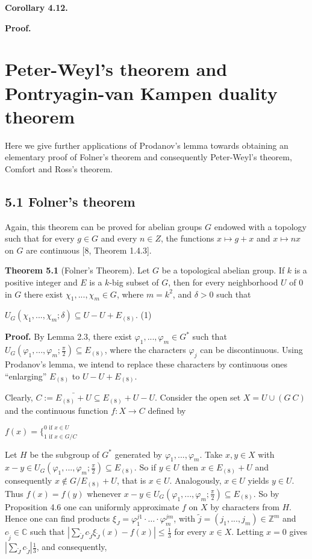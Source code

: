 \documentclass[12pt]{article}
\begin{document}
\textbf{Corollary 4.12.}


\textbf{Proof.}


\section{Peter-Weyl's theorem and Pontryagin-van Kampen duality theorem}


    Here we give further applications of Prodanov's lemma towards obtaining an elementary proof of Folner's theorem and
consequently Peter-Weyl's theorem, Comfort and Ross's theorem.


\subsection{5.1 Folner's theorem}


    Again, this theorem can be proved for abelian groups $G$ endowed with a topology such that for every $g \in G$ and every
$n \in Z$, the functions $x \mapsto g + x$ and $x \mapsto nx$ on $G$ are continuous [8, Theorem 1.4.3].


\textbf{Theorem 5.1} (Folner's Theorem). Let $G$ be a topological abelian group. If $k$ is a positive integer and $E$ is a $k$-big subset of $G$, then for
every neighborhood $U$ of 0 in $G$ there exist $\chi_1,...,\chi_m \in G$, where $m = k^2$, and $\delta > 0$ such that


    $U_G(\chi_1,...,\chi_m; \delta) \subseteq U - U + E_{(8)}$.  (1)


\textbf{Proof.} By Lemma 2.3, there exist $\varphi_1,...,\varphi_m \in G^*$ such that $U_G(\varphi_1,...,\varphi_m; \frac{\pi}{2} ) \subseteq E_{(8)}$, where the characters $\varphi_j$ can be
discontinuous. Using Prodanov's lemma, we intend to replace these characters by continuous ones “enlarging” $E_{(8)}$ to
$U - U + E_{(8)}$.


    Clearly, $C := \bar{E_{(8)} + U }\subseteq E_{(8)} + U - U$. Consider the open set $X = U \cup (G \ C)$ and the continuous function $f : X \to C$
defined by


    $f(x) = \{^{0 \text{ if } x \in U}_{1 \text{ if } x \in G / C} $


    Let $H$ be the subgroup of $G^*$ generated by $\varphi_1,...,\varphi_m$. Take $x, y \in X$ with $x - y \in U_G(\varphi_1,...,\varphi_m; \frac{\pi}{2} ) \subseteq E_{(8)}$. So if $y \in U$ then
$x \in E_{(8)} + U$ and consequently $x \notin G / E_{(8)} + U$, that is $x \in U$. Analogously, $x \in U$ yields $y \in U$. Thus $f(x) = f(y)$ whenever
$x - y \in U_G(\varphi_1,...,\varphi_m; \frac{\pi}{2} ) \subseteq E_{(8)}$. So by Proposition 4.6 one can uniformly approximate $f$ on $X$ by characters from $H$. Hence
one can find products $\xi_J = \varphi^{j1}_1 \cdot \dots \cdot \varphi^{jm}_m$, with $\tilde{j} = (j_1,..., j_m) \in \mathbb{Z}^m$ and $c_{\tilde{j}} \in \mathbb{C}$ such that $|\sum_{\tilde{J}} c_{\tilde{J}} \xi_{\tilde{J}}(x) - f(x)| \leqslant \frac{1}{3}$ for every
$x \in X$. Letting $x = 0$ gives $|\sum_{\tilde{J}} c_{\tilde{J}}|  \frac{1}{3}$, and consequently,
\end{document}

